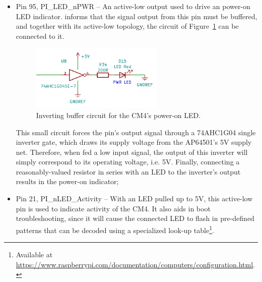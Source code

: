 \begin{itemize}
	\item Pin 95, PI\_LED\_nPWR -- An active-low output used to drive an power-on LED indicator.
	\cite{CM4} informs that the signal output from this pin must be buffered, and together with its active-low topology, the circuit of Figure~\ref{fig:PI_LED_nPWR} can be connected to it.
	\begin{figure}[H]
		\centering
		\includegraphics[width=0.6\textwidth]{Chapters/Figures/chapter3/PI_LED_nPWR.pdf}
		\caption{Inverting buffer circuit for the CM4's power-on LED.}
		\label{fig:PI_LED_nPWR}
	\end{figure}
	This small circuit forces the pin's output signal through a 74AHC1G04 single inverter gate, which draws its supply voltage from the AP64501's 5V supply net. Therefore, when fed a low input signal, the output of this inverter will simply correspond to its operating voltage, i.e. 5V. Finally, connecting a reasonably-valued resistor in series with an LED to the inverter's output results in the power-on indicator;

	\item Pin 21, PI\_nLED\_Activity -- With an LED pulled up to 5V, this active-low pin is used to indicate activity of the CM4. It also aids in boot troubleshooting, since it will cause the connected LED to flash in pre-defined patterns that can be decoded using a specialized look-up table\footnote[17]{Available at \url{https://www.raspberrypi.com/documentation/computers/configuration.html}.}.
\end{itemize}

